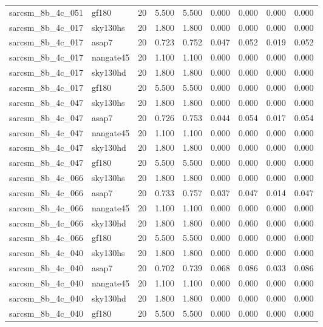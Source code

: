 \begin{tabular}{llrrrrrrr}
sarcsm\_8b\_4c\_051 & gf180 & 20 & 5.500 & 5.500 & 0.000 & 0.000 & 0.000 & 0.000 \\
sarcsm\_8b\_4c\_017 & sky130hs & 20 & 1.800 & 1.800 & 0.000 & 0.000 & 0.000 & 0.000 \\
sarcsm\_8b\_4c\_017 & asap7 & 20 & 0.723 & 0.752 & 0.047 & 0.052 & 0.019 & 0.052 \\
sarcsm\_8b\_4c\_017 & nangate45 & 20 & 1.100 & 1.100 & 0.000 & 0.000 & 0.000 & 0.000 \\
sarcsm\_8b\_4c\_017 & sky130hd & 20 & 1.800 & 1.800 & 0.000 & 0.000 & 0.000 & 0.000 \\
sarcsm\_8b\_4c\_017 & gf180 & 20 & 5.500 & 5.500 & 0.000 & 0.000 & 0.000 & 0.000 \\
sarcsm\_8b\_4c\_047 & sky130hs & 20 & 1.800 & 1.800 & 0.000 & 0.000 & 0.000 & 0.000 \\
sarcsm\_8b\_4c\_047 & asap7 & 20 & 0.726 & 0.753 & 0.044 & 0.054 & 0.017 & 0.054 \\
sarcsm\_8b\_4c\_047 & nangate45 & 20 & 1.100 & 1.100 & 0.000 & 0.000 & 0.000 & 0.000 \\
sarcsm\_8b\_4c\_047 & sky130hd & 20 & 1.800 & 1.800 & 0.000 & 0.000 & 0.000 & 0.000 \\
sarcsm\_8b\_4c\_047 & gf180 & 20 & 5.500 & 5.500 & 0.000 & 0.000 & 0.000 & 0.000 \\
sarcsm\_8b\_4c\_066 & sky130hs & 20 & 1.800 & 1.800 & 0.000 & 0.000 & 0.000 & 0.000 \\
sarcsm\_8b\_4c\_066 & asap7 & 20 & 0.733 & 0.757 & 0.037 & 0.047 & 0.014 & 0.047 \\
sarcsm\_8b\_4c\_066 & nangate45 & 20 & 1.100 & 1.100 & 0.000 & 0.000 & 0.000 & 0.000 \\
sarcsm\_8b\_4c\_066 & sky130hd & 20 & 1.800 & 1.800 & 0.000 & 0.000 & 0.000 & 0.000 \\
sarcsm\_8b\_4c\_066 & gf180 & 20 & 5.500 & 5.500 & 0.000 & 0.000 & 0.000 & 0.000 \\
sarcsm\_8b\_4c\_040 & sky130hs & 20 & 1.800 & 1.800 & 0.000 & 0.000 & 0.000 & 0.000 \\
sarcsm\_8b\_4c\_040 & asap7 & 20 & 0.702 & 0.739 & 0.068 & 0.086 & 0.033 & 0.086 \\
sarcsm\_8b\_4c\_040 & nangate45 & 20 & 1.100 & 1.100 & 0.000 & 0.000 & 0.000 & 0.000 \\
sarcsm\_8b\_4c\_040 & sky130hd & 20 & 1.800 & 1.800 & 0.000 & 0.000 & 0.000 & 0.000 \\
sarcsm\_8b\_4c\_040 & gf180 & 20 & 5.500 & 5.500 & 0.000 & 0.000 & 0.000 & 0.000 \\

\end{tabular}
